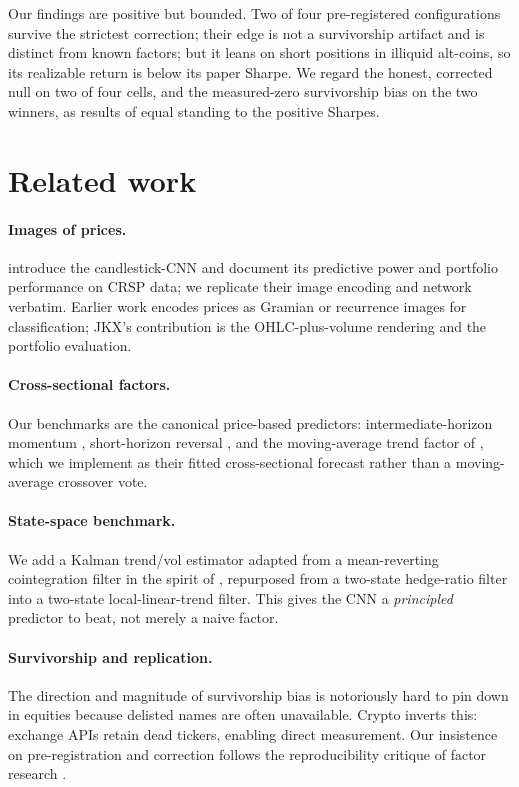 \documentclass[11pt]{article}
\begin{document}
Our findings are positive but bounded. Two of four pre-registered configurations survive the
strictest correction; their edge is not a survivorship artifact and is distinct from known factors;
but it leans on short positions in illiquid alt-coins, so its realizable return is below its
paper Sharpe. We regard the honest, corrected null on two of four cells, and the measured-zero
survivorship bias on the two winners, as results of equal standing to the positive Sharpes.

\section{Related work}

\paragraph{Images of prices.} \citet{jiang2023reimagining} introduce the candlestick-CNN and
document its predictive power and portfolio performance on CRSP data; we replicate their image
encoding and network verbatim. Earlier work encodes prices as Gramian or recurrence images for
classification; JKX's contribution is the OHLC-plus-volume rendering and the portfolio evaluation.

\paragraph{Cross-sectional factors.} Our benchmarks are the canonical price-based predictors:
intermediate-horizon momentum \citep{jegadeesh1993returns}, short-horizon reversal
\citep{jegadeesh1990evidence,lehmann1990fads}, and the moving-average trend factor of
\citet{han2016trend}, which we implement as their fitted cross-sectional forecast rather than a
moving-average crossover vote.

\paragraph{State-space benchmark.} We add a Kalman trend/vol estimator adapted from a
mean-reverting cointegration filter in the spirit of \citet{avellaneda2010statistical}, repurposed
from a two-state hedge-ratio filter into a two-state local-linear-trend filter. This gives the CNN
a \emph{principled} predictor to beat, not merely a naive factor.

\paragraph{Survivorship and replication.} The direction and magnitude of survivorship bias is
notoriously hard to pin down in equities because delisted names are often unavailable. Crypto
inverts this: exchange APIs retain dead tickers, enabling direct measurement. Our insistence on
pre-registration and correction follows the reproducibility critique of factor research
\citep{harvey2016andthecrosssection}.
\end{document}
